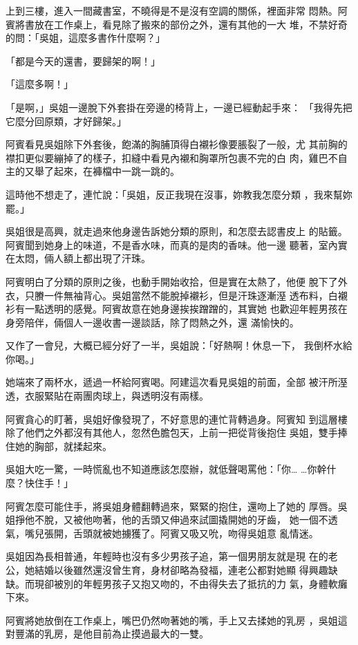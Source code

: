 上到三樓，進入一間藏書室，不曉得是不是沒有空調的關係，裡面非常
悶熱。阿賓將書放在工作桌上，看見除了搬來的部份之外，還有其他的一大
堆，不禁好奇的問：「吳姐，這麼多書作什麼啊？」

「都是今天的還書，要歸架的啊！」

「這麼多啊！」

「是啊，」吳姐一邊脫下外套掛在旁邊的椅背上，一邊已經動起手來：
「我得先把它麼分回原類，才好歸架。」

阿賓看見吳姐除下外套後，飽滿的胸脯頂得白襯衫像要脹裂了一般，尤
其前胸的襟扣更似要繃掉了的樣子，扣縫中看見內襯和胸罩所包裹不完的白
肉，雞巴不自主的又舉了起來，在褲檔中一跳一跳的。

這時他不想走了，連忙說：「吳姐，反正我現在沒事，妳教我怎麼分類
，我來幫妳罷。」

吳姐很是高興，就走過來他身邊告訴她分類的原則，和怎麼去認書皮上
的貼籤。阿賓聞到她身上的味道，不是香水味，而真的是肉的香味。他一邊
聽著，室內實在太悶，倆人額上都出現了汗珠。

阿賓明白了分類的原則之後，也動手開始收拾，但是實在太熱了，他便
脫下了外衣，只賸一件無袖背心。吳姐當然不能脫掉襯衫，但是汗珠逐漸溼
透布料，白襯衫有一點透明的感覺。阿賓故意在她身邊挨挨蹭蹭的，其實她
也歡迎年輕男孩在身旁陪伴，倆個人一邊收書一邊談話，除了悶熱之外，還
滿愉快的。

又作了一會兒，大概已經分好了一半，吳姐說：「好熱啊！休息一下，
我倒杯水給你喝。」

她端來了兩杯水，遞過一杯給阿賓喝。阿建這次看見吳姐的前面，全部
被汗所溼透，衣服緊貼在兩團肉球上，與透明沒有兩樣。

阿賓貪心的盯著，吳姐好像發現了，不好意思的連忙背轉過身。阿賓知
到這層樓除了他們之外都沒有其他人，忽然色膽包天，上前一把從背後抱住
吳姐，雙手捧住她的胸部，就揉起來。

吳姐大吃一驚，一時慌亂也不知道應該怎麼辦，就低聲喝罵他：「你…
…你幹什麼？快住手！」

阿賓怎麼可能住手，將吳姐身體翻轉過來，緊緊的抱住，還吻上了她的
厚唇。吳姐掙他不脫，又被他吻著，他的舌頭又伸過來試圖撬開她的牙齒，
她一個不透氣，嘴兒張開，舌頭就被她擄獲了。阿賓又吸又吮，吻得吳姐意
亂情迷。

吳姐因為長相普通，年輕時也沒有多少男孩子追，第一個男朋友就是現
在的老公，她結婚以後雖然還沒曾生育，身材卻略為發福，連老公都對她顯
得興趣缺缺。而現卻被別的年輕男孩子又抱又吻的，不由得失去了抵抗的力
氣，身體軟癱下來。

阿賓將她放倒在工作桌上，嘴巴仍然吻著她的嘴，手上又去揉她的乳房
，吳姐這對豐滿的乳房，是他目前為止摸過最大的一雙。

